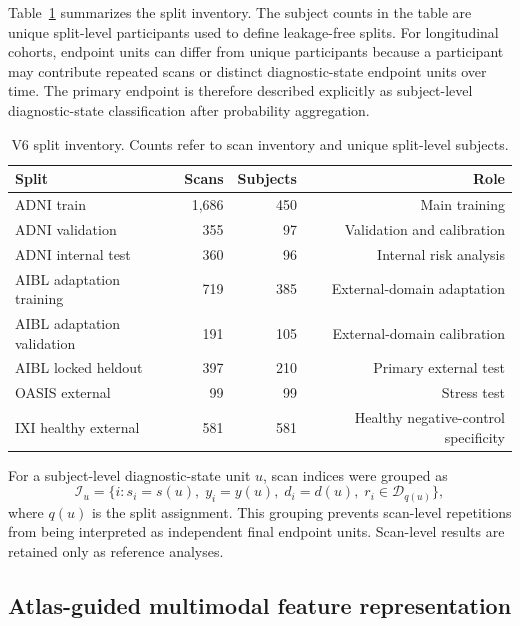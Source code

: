 \documentclass[12pt,a4paper]{article}
\begin{document}
Table~\ref{tab:v6_splits} summarizes the split inventory. The subject counts in the table are unique split-level participants used to define leakage-free splits. For longitudinal cohorts, endpoint units can differ from unique participants because a participant may contribute repeated scans or distinct diagnostic-state endpoint units over time. The primary endpoint is therefore described explicitly as subject-level diagnostic-state classification after probability aggregation.

\begin{table}[t]
\centering
\caption{V6 split inventory. Counts refer to scan inventory and unique split-level subjects.}
\label{tab:v6_splits}
\small
\begin{tabular}{@{}lrrr@{}}
\toprule
Split & Scans & Subjects & Role \\
\midrule
ADNI train & 1{,}686 & 450 & Main training \\
ADNI validation & 355 & 97 & Validation and calibration \\
ADNI internal test & 360 & 96 & Internal risk analysis \\
AIBL adaptation training & 719 & 385 & External-domain adaptation \\
AIBL adaptation validation & 191 & 105 & External-domain calibration \\
AIBL locked heldout & 397 & 210 & Primary external test \\
OASIS external & 99 & 99 & Stress test \\
IXI healthy external & 581 & 581 & Healthy negative-control specificity \\
\bottomrule
\end{tabular}
\end{table}

For a subject-level diagnostic-state unit $u$, scan indices were grouped as
\begin{equation}
\mathcal{I}_u =
\{i: s_i=s(u),\; y_i=y(u),\; d_i=d(u),\; r_i\in\mathcal{D}_{q(u)}\},
\label{eq:endpoint_group}
\end{equation}
where $q(u)$ is the split assignment. This grouping prevents scan-level repetitions from being interpreted as independent final endpoint units. Scan-level results are retained only as reference analyses.

\subsection{Atlas-guided multimodal feature representation}
\label{sec:features}
\end{document}
